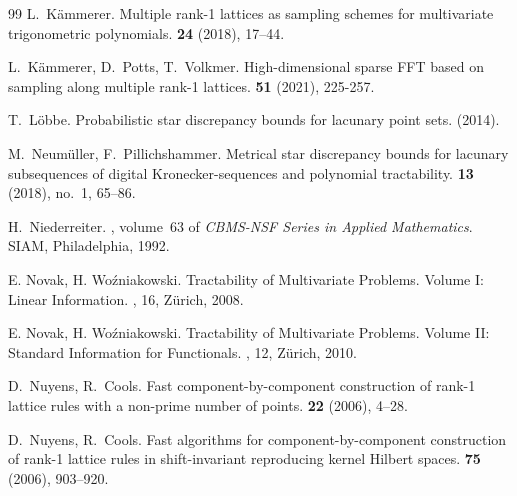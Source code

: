 \documentclass[12pt]{article}
\theoremstyle{definition}
\numberwithin{equation}{section}
\begin{document}
\begin{thebibliography}{99}
L.~K\"ammerer.
\newblock Multiple rank-1 lattices as sampling schemes for multivariate trigonometric polynomials.
 \textbf{24} (2018), 17--44.

L.~K\"ammerer, D.~Potts, T.~Volkmer.
\newblock High-dimensional sparse FFT based on sampling along multiple rank-1 lattices.
 \textbf{51} (2021), 225-257.




T.~L\"obbe.
\newblock Probabilistic star discrepancy bounds for lacunary point sets.
 (2014).




M.~Neum\"uller, F.~Pillichshammer. 
\newblock Metrical star discrepancy bounds for lacunary subsequences of digital Kronecker-sequences and polynomial tractability. 
 \textbf{13} (2018), no.~1, 65--86. 


H.~Niederreiter.
,
  volume~63 of {\em CBMS-NSF Series in Applied Mathematics}.
\newblock SIAM, Philadelphia, 1992.

E. Novak, H. Wo\'{z}niakowski.
\newblock Tractability of Multivariate Problems. Volume I: Linear Information. 
, 16, Z\"urich, 2008.

E. Novak, H. Wo\'{z}niakowski. 
\newblock Tractability of Multivariate Problems. Volume II: Standard Information for Functionals. , 12, Z\"urich, 2010.

D.~Nuyens, R.~Cools.
\newblock Fast component-by-component construction of rank-1 lattice rules with a non-prime number of points.
 \textbf{22} (2006), 4--28.

D.~Nuyens, R.~Cools.
\newblock Fast algorithms for component-by-component construction of rank-1 lattice rules in shift-invariant reproducing kernel Hilbert spaces.
 \textbf{75} (2006), 903--920.



\end{thebibliography}
\end{document}
